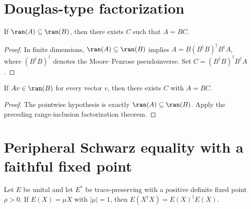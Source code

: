 \section{Douglas-type factorization}

\begin{theorem}
    \label{thm:douglas_range_inclusion_factorization}
    \leanok
    If $\ran(A) \subseteq \ran(B)$, then
    there exists $C$ such that $A = B C$.
\end{theorem}

\begin{proof}
    In finite dimensions, $\ran(A) \subseteq \ran(B)$ implies
    $A=B(B^\dagger B)^\dagger B^\dagger A$, where
    $(B^\dagger B)^\dagger$ denotes the Moore--Penrose pseudoinverse.
    Set $C=(B^\dagger B)^\dagger B^\dagger A$.
\end{proof}

\begin{theorem}
    \label{thm:douglas_vectorwise_range_factorization}
    \leanok
    If $A v \in \ran(B)$ for every vector $v$, then
    there exists $C$ with $A = B C$.
\end{theorem}

\begin{proof}
    \leanok
    The pointwise hypothesis is exactly $\ran(A)\subseteq\ran(B)$.
    Apply the preceding range-inclusion factorization theorem.
\end{proof}

\section{Peripheral Schwarz equality with a faithful fixed point}

\begin{theorem}
    \label{thm:ks_equality_of_peripheral_eigenvector_of_fixedPoint}
    \leanok
    Let $E$ be unital and let $E^*$ be trace-preserving with a positive
    definite fixed point $\rho > 0$. If $E(X) = \mu X$ with $|\mu| = 1$, then
    $E(X^\dagger X) = E(X)^\dagger E(X)$.
\end{theorem}

